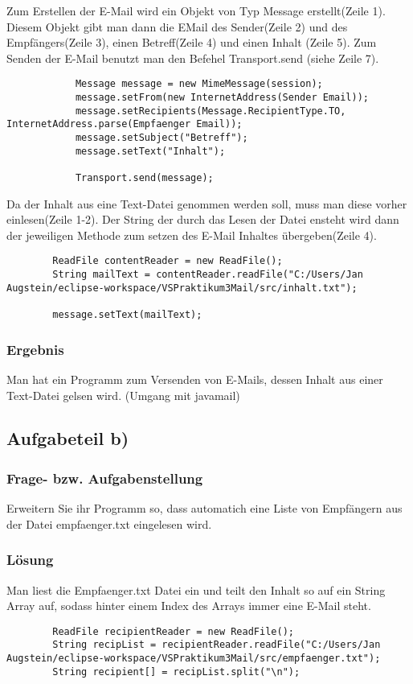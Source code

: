Zum Erstellen der E-Mail wird ein Objekt von Typ Message erstellt(Zeile 1). Diesem Objekt gibt man dann die EMail des Sender(Zeile 2) und des Empfängers(Zeile 3), einen Betreff(Zeile 4) und einen Inhalt (Zeile 5). Zum Senden der E-Mail benutzt man den Befehel Transport.send (siehe Zeile 7).
\begin{lstlisting}
			Message message = new MimeMessage(session);
			message.setFrom(new InternetAddress(Sender Email));
			message.setRecipients(Message.RecipientType.TO, InternetAddress.parse(Empfaenger Email));
			message.setSubject("Betreff");
			message.setText("Inhalt");
			
			Transport.send(message);
\end{lstlisting}


Da der Inhalt aus eine Text-Datei genommen werden soll, muss man diese vorher einlesen(Zeile 1-2). Der String der durch das Lesen der Datei ensteht wird dann der jeweiligen Methode zum setzen des E-Mail Inhaltes übergeben(Zeile 4).
\begin{lstlisting}
		ReadFile contentReader = new ReadFile();
		String mailText = contentReader.readFile("C:/Users/Jan Augstein/eclipse-workspace/VSPraktikum3Mail/src/inhalt.txt");
		
		message.setText(mailText);
\end{lstlisting}

\subsubsection{Ergebnis}
Man hat ein Programm zum Versenden von E-Mails, dessen Inhalt aus einer Text-Datei gelsen wird. (Umgang mit javamail)

\subsection{Aufgabeteil b)}
\subsubsection{Frage- bzw. Aufgabenstellung}
 Erweitern Sie ihr Programm so, dass automatich eine Liste von Empfängern aus der Datei empfaenger.txt eingelesen wird.
 
\subsubsection{Lösung}
Man liest die Empfaenger.txt Datei ein und teilt den Inhalt so auf ein String Array auf, sodass hinter einem Index des Arrays immer eine E-Mail steht. 
\begin{lstlisting}
		ReadFile recipientReader = new ReadFile();
		String recipList = recipientReader.readFile("C:/Users/Jan Augstein/eclipse-workspace/VSPraktikum3Mail/src/empfaenger.txt");
		String recipient[] = recipList.split("\n");
\end{lstlisting} 


